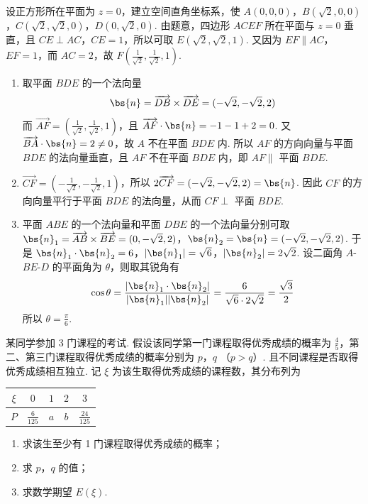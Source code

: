 \begin{solution}
设正方形所在平面为 \(z=0\)，建立空间直角坐标系，使 \(A(0,0,0)\)，\(B(\sqrt{2},0,0)\)，\(C(\sqrt{2},\sqrt{2},0)\)，\(D(0,\sqrt{2},0)\).
由题意，四边形 \(ACEF\) 所在平面与 \(z=0\) 垂直，且 \(CE\perp AC\)，\(CE=1\)，所以可取 \(E(\sqrt{2},\sqrt{2},1)\). 又因为 \(EF\parallel AC\)，\(EF=1\)，而 \(AC=2\)，故 \(F\left(\frac{1}{\sqrt{2}},\frac{1}{\sqrt{2}},1\right)\).

\begin{enumerate}
\item 取平面 \(BDE\) 的一个法向量
\[
\bs{n}=\overrightarrow{DB}\times\overrightarrow{DE}=(-\sqrt{2},-\sqrt{2},2)
\]
而 \(\overrightarrow{AF}=\left(\frac{1}{\sqrt{2}},\frac{1}{\sqrt{2}},1\right)\)，且 \(\overrightarrow{AF}\cdot\bs{n}=-1-1+2=0\).
又 \(\overrightarrow{BA}\cdot\bs{n}=2\neq0\)，故 \(A\) 不在平面 \(BDE\) 内. 所以 \(AF\) 的方向向量与平面 \(BDE\) 的法向量垂直，且 \(AF\) 不在平面 \(BDE\) 内，即 \(AF\parallel\) 平面 \(BDE\).

\item \(\overrightarrow{CF}=\left(-\frac{1}{\sqrt{2}},-\frac{1}{\sqrt{2}},1\right)\)，所以 \(2\overrightarrow{CF}=(-\sqrt{2},-\sqrt{2},2)=\bs{n}\).
因此 \(CF\) 的方向向量平行于平面 \(BDE\) 的法向量，从而 \(CF\perp\) 平面 \(BDE\).

\item 平面 \(ABE\) 的一个法向量和平面 \(DBE\) 的一个法向量分别可取 \(\bs{n}_{1}=\overrightarrow{AB}\times\overrightarrow{BE}=(0,-\sqrt{2},2)\)，\(\bs{n}_{2}=\bs{n}=(-\sqrt{2},-\sqrt{2},2)\).
于是 \(\bs{n}_{1}\cdot\bs{n}_{2}=6\)，\(|\bs{n}_{1}|=\sqrt{6}\)，\(|\bs{n}_{2}|=2\sqrt{2}\).
设二面角 \(A\)-\(BE\)-\(D\) 的平面角为 \(\theta\)，则取其锐角有
\[
\cos\theta=\frac{|\bs{n}_{1}\cdot\bs{n}_{2}|}{|\bs{n}_{1}||\bs{n}_{2}|}=\frac{6}{\sqrt{6}\cdot2\sqrt{2}}=\frac{\sqrt{3}}{2}
\]
所以 \(\theta=\frac{\pi}{6}\).
\end{enumerate}
\end{solution}

\begin{problem}
某同学参加 3 门课程的考试. 假设该同学第一门课程取得优秀成绩的概率为 \(\frac{4}{5}\)，第二、第三门课程取得优秀成绩的概率分别为 \(p\)，\(q\) （\(p > q\)）. 且不同课程是否取得优秀成绩相互独立. 记 \(\xi\) 为该生取得优秀成绩的课程数，其分布列为

\begin{center}
\begin{tabular}{c|cccc}
\(\xi\) & \(0\) & \(1\) & \(2\) & \(3\) \\
\hline
\(P\) & \(\frac{6}{125}\) & \(a\) & \(b\) & \(\frac{24}{125}\)
\end{tabular}
\end{center}

\begin{enumerate}
\item 求该生至少有 1 门课程取得优秀成绩的概率；
\item 求 \(p\)，\(q\) 的值；
\item 求数学期望 \(E(\xi)\).
\end{enumerate}
\end{problem}

